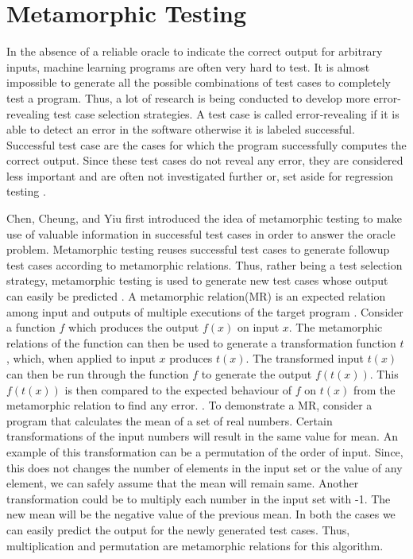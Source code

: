 \section{Metamorphic Testing}\label{2.2MetamorphicTesting}

In the absence of a reliable oracle to indicate the correct output for arbitrary inputs, machine learning programs are often very hard to test. It is almost impossible to generate all the possible combinations of test cases to completely test a program. Thus, a lot of research is being conducted to develop more error-revealing test case selection strategies. A test case is called error-revealing if it is able to detect an error in the software otherwise it is labeled successful. Successful test case are the cases for which the program successfully computes the correct output. Since these test cases do not reveal any error, they are considered less important and are often not investigated further or, set aside for regression testing \cite{Zhou2004, Chen2003}.

Chen, Cheung, and Yiu \cite{Chen1998} first introduced the idea of metamorphic testing to make use of valuable information in successful test cases in order to answer the oracle problem. Metamorphic testing reuses successful test cases to generate followup test cases according to metamorphic relations. Thus, rather being a test selection strategy, metamorphic testing is used to generate new test cases whose output can easily be predicted \cite{Murphy2008}. A metamorphic relation(MR) is an expected relation among input and outputs of multiple executions of the target program \cite{Chen2003,Zhou2016}. Consider a function $f$ which produces the output $f(x)$ on input $x$. The metamorphic relations of the function can then be used to generate a transformation function $t$, which, when applied to input $x$ produces $t(x)$. The transformed input $t(x)$ can then be run through the function $f$ to generate the output $f(t(x))$. This $f(t(x))$ is then compared to the expected behaviour of $f$ on $t(x)$ from the metamorphic relation to find any error. \cite{Murphy2009}. 
To demonstrate a MR, consider a program that calculates the mean of a set of real numbers. Certain transformations of the input numbers will result in the same value for mean. An example of this transformation can be a permutation of the order of input. Since, this does not changes the number of elements in the input set or the value of any element, we can safely assume that the mean will remain same. Another transformation could be to multiply each number in the input set with -1. The new mean will be the negative value of the previous mean. In both the cases we can easily predict the output for the newly generated test cases. Thus, multiplication and permutation are metamorphic relations for this algorithm.

